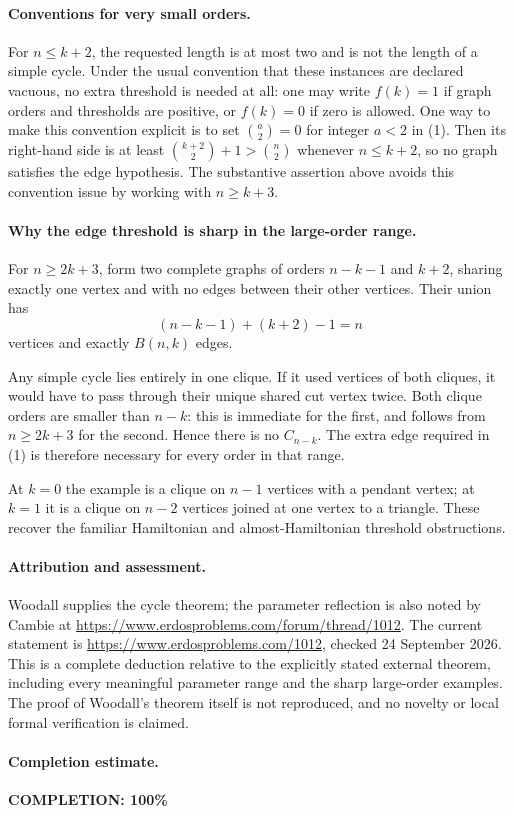\paragraph{Conventions for very small orders.}
For \(n\leq k+2\), the requested length is at most two and is not the length of a simple cycle. Under the usual convention that these instances are declared vacuous, no extra threshold is needed at all: one may write \(f(k)=1\) if graph orders and thresholds are positive, or \(f(k)=0\) if zero is allowed. One way to make this convention explicit is to set \(\binom{a}{2}=0\) for integer \(a<2\) in (1). Then its right-hand side is at least \(\binom{k+2}{2}+1>\binom n2\) whenever \(n\leq k+2\), so no graph satisfies the edge hypothesis. The substantive assertion above avoids this convention issue by working with \(n\geq k+3\).

\paragraph{Why the edge threshold is sharp in the large-order range.}
For \(n\geq2k+3\), form two complete graphs of orders \(n-k-1\) and \(k+2\), sharing exactly one vertex and with no edges between their other vertices. Their union has
\[
 (n-k-1)+(k+2)-1=n
\]
vertices and exactly \(B(n,k)\) edges.

Any simple cycle lies entirely in one clique. If it used vertices of both cliques, it would have to pass through their unique shared cut vertex twice. Both clique orders are smaller than \(n-k\): this is immediate for the first, and follows from \(n\geq2k+3\) for the second. Hence there is no \(C_{n-k}\). The extra edge required in (1) is therefore necessary for every order in that range.

At \(k=0\) the example is a clique on \(n-1\) vertices with a pendant vertex; at \(k=1\) it is a clique on \(n-2\) vertices joined at one vertex to a triangle. These recover the familiar Hamiltonian and almost-Hamiltonian threshold obstructions.

\paragraph{Attribution and assessment.}
Woodall supplies the cycle theorem; the parameter reflection is also noted by Cambie at \url{https://www.erdosproblems.com/forum/thread/1012}. The current statement is \url{https://www.erdosproblems.com/1012}, checked 24 September 2026. This is a complete deduction relative to the explicitly stated external theorem, including every meaningful parameter range and the sharp large-order examples. The proof of Woodall's theorem itself is not reproduced, and no novelty or local formal verification is claimed.

\paragraph{Completion estimate.}
\textbf{COMPLETION: 100\%}
